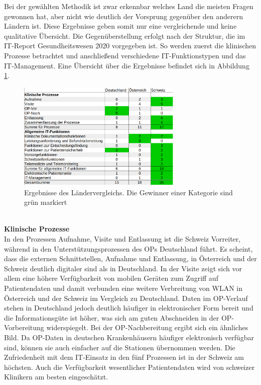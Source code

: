Bei der gewählten Methodik ist zwar erkennbar welches Land die meisten Fragen gewonnen hat, aber nicht wie deutlich der Vorsprung gegenüber den anderern Ländern ist. Diese Ergebnisse geben somit nur eine vergleichende und keine qualitative Übersicht. Die Gegenüberstellung erfolgt nach der Struktur, die im IT-Report Gesundheitswesen 2020 vorgegeben ist. So werden zuerst die klinischen Prozesse betrachtet und anschließend verschiedene IT-Funktionstypen und das IT-Management. Eine Übersicht über die Ergebnisse befindet sich in Abbildung \ref{fig:laender_ergebnisse}.
\begin{figure}
	\centering
	\includegraphics[width=0.7\textwidth]{Bilder/laendervergleich_ergebnisse.png}
	\caption{Ergebnisse des Ländervergleichs. Die Gewinner einer Kategorie sind grün markiert}
	\label{fig:laender_ergebnisse}
\end{figure}
\vspace{\parheadvspace}\\
\textbf{Klinische Prozesse}\\
In den Prozessen Aufnahme, Visite und Entlassung ist die Schweiz Vorreiter, während in den Unterstützungsprozessen des OPs Deutschland führt. Es scheint, dass die externen Schnittstellen, Aufnahme und Entlassung, in Österreich und der Schweiz deutlich digitaler sind als in Deutschland. In der Visite zeigt sich vor allem eine höhere Verfügbarkeit von mobilen Geräten zum Zugriff auf Patientendaten und damit verbunden eine weitere Verbreitung von WLAN in Österreich und der Schweiz im Vergleich zu Deutschland. Daten im OP-Verlauf stehen in Deutschland jedoch deutlich häufiger in elektronischer Form bereit und die Informationsgüte ist höher, was sich am guten Abschneiden in der OP-Vorbereitung widerspiegelt. Bei der OP-Nachbereitung ergibt sich ein ähnliches Bild. Da OP-Daten in deutschen Krankenhäusern häufiger elektronisch verfügbar sind, können sie auch einfacher auf die Stationen übernommen werden. Die Zufriedenheit mit dem IT-Einsatz in den fünf Prozessen ist in der Schweiz am höchsten. Auch die Verfügbarkeit wesentlicher Patientendaten wird von schweizer Klinikern am besten eingeschätzt.
